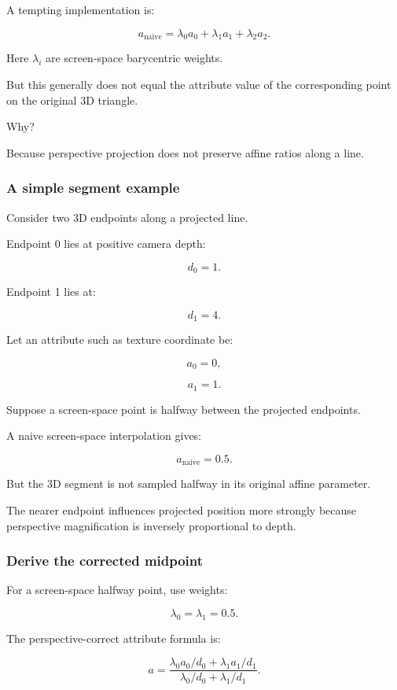 A tempting implementation is:

\[
 \boxed{ a_{\mathrm{naive}}= \lambda_0a_0+\lambda_1a_1+\lambda_2a_2 }.
\]

Here \(\lambda_i\) are screen-space barycentric weights.

But this generally does not equal the attribute value of the corresponding point on the original 3D triangle.

Why?

Because perspective projection does not preserve affine ratios along a line.

\subsubsection{A simple segment example}\label{a-simple-segment-example}

Consider two 3D endpoints along a projected line.

Endpoint 0 lies at positive camera depth:

\[
 d_0=1.
\]

Endpoint 1 lies at:

\[
 d_1=4.
\]

Let an attribute such as texture coordinate be:

\[
 a_0=0,
\]

\[
 a_1=1.
\]

Suppose a screen-space point is halfway between the projected endpoints.

A naive screen-space interpolation gives:

\[
 \boxed{ a_{\mathrm{naive}}=0.5 }.
\]

But the 3D segment is not sampled halfway in its original affine parameter.

The nearer endpoint influences projected position more strongly because perspective magnification is inversely proportional to depth.

\subsubsection{Derive the corrected midpoint}\label{derive-the-corrected-midpoint}

For a screen-space halfway point, use weights:

\[
 \lambda_0=\lambda_1=0.5.
\]

The perspective-correct attribute formula is:

\[
 a= \frac{ \lambda_0a_0/d_0+\lambda_1a_1/d_1 }{ \lambda_0/d_0+\lambda_1/d_1 }.
\]

